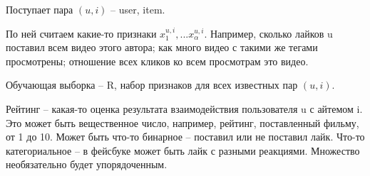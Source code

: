 Поступает пара $(u, i)$ -- user, item. 

По ней считаем какие-то признаки $x^{u, i}_1, ... x^{u, i}_\alpha$. Например, сколько лайков u поставил всем видео этого автора; как много видео с такими же тегами просмотрены; отношение всех кликов ко всем просмотрам это видео. 

Обучающая выборка -- R, набор признаков для всех известных пар $(u, i)$.

Рейтинг -- какая-то оценка результата взаимодействия пользователя u с айтемом i. Это может быть вещественное число, например, рейтинг, поставленный фильму, от 1 до 10. Может быть что-то бинарное -- поставил или не поставил лайк. Что-то категориальное -- в фейсбуке может быть лайк с разными реакциями. Множество необязательно будет упорядоченным.
